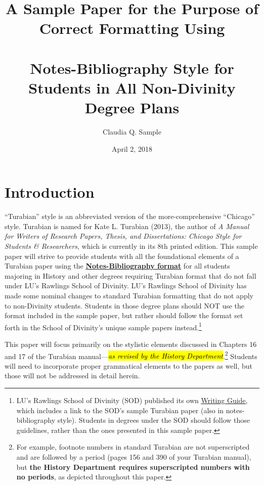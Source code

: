 \documentclass[raggedright]{turabian-researchpaper}
\title{\normalfont A Sample Paper for the Purpose of Correct Formatting Using
  \\\ \\ \textbf{Notes-Bibliography} Style for Students in All
  \textbf{Non-Divinity} Degree Plans}
\author{Claudia Q. Sample}
\date{April 2, 2018}
\newcommand*{\bluehref}[2]{\href{#1}{\color{blue}\ul{#2}}}
\begin{document}
\maketitle

\setcounter{page}{2}
\pagestyle{plain}
\setcounter{tocdepth}{2}
\tableofcontents
\clearpage
{}
\pagestyle{headings}

\section{Introduction}

``Turabian'' style is an abbreviated version of the more-comprehensive
``Chicago'' style. Turabian is named for Kate L. Turabian (2013), the author of
\textit{A Manual for Writers of Research Papers, Thesis, and Dissertations:
Chicago Style for Students \& Researchers}, which is currently in its 8th
printed edition.\autocite{Turabian} This sample paper will strive to provide
students with all the foundational elements of a Turabian paper using the
\textbf{\ul{Notes-Bibliography format}} for all students majoring in History and
other degrees requiring Turabian format that do not fall under LU's Rawlings
School of Divinity. LU's Rawlings School of Divinity has made some nominal
changes to standard Turabian formatting that do not apply to non-Divinity
students. Students in those degree plans should NOT use the format included in
the sample paper, but rather should follow the format set forth in the School of
Divinity's unique sample papers instead.\footnote{LU's Rawlings School of
Divinity (SOD) published its own
\bluehref{http://www.liberty.edu/divinity/index.cfm?PID=28160}{Writing Guide},
which includes a link to the SOD's sample Turabian paper (also in
notes-bibliography style). Students in degrees under the SOD should follow those
guidelines, rather than the ones presented in this sample paper.}

This paper will focus primarily on the stylistic elements discussed in Chapters
16 and 17 of the Turabian
manual\autocite[\protect\label{fn:three}][144-215]{Turabian}---\hl{\emph{as
revised by the History Department}}.\footnote{For example, footnote numbers in
standard Turabian are not superscripted and are followed by a period (pages 156
and 390 of your Turabian manual), but \textbf{the History Department requires
superscripted numbers with no periods}, as depicted throughout this paper.}
Students will need to incorporate proper grammatical elements to the papers as
well, but those will not be addressed in detail herein.
\end{document}
